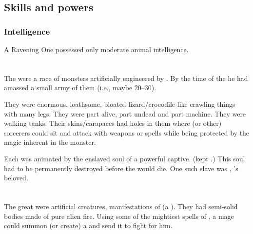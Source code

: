 \subsection{Skills and powers}





\subsubsection{Intelligence}
A Ravening One possessed only moderate animal intelligence. 















\section{\Reptilecolossus}
\index{\reptilecolossus}
The \reptilecolossi were a race of monsters artificially engineered by \Secherdamon. 
By the time of the \thirdbanewar he had amassed a small army of them (i.e., maybe 20--30). 

They were enormous, loathsome, bloated lizard/crocodile-like crawling things with many legs. 
They were part alive, part undead and part machine. 
They were walking tanks.
Their skins/carapaces had holes in them where \ophidian (or other) sorcerers could sit and attack with weapons or spells while being protected by the magic inherent in the monster. 

Each \reptilecolossus was animated by the enslaved soul of a powerful \resphan captive. 
(\Secherdamon kept .) 
This soul had to be permanently destroyed before the \reptilecolossus would die. 
One such slave was , \Sithiyacaan's beloved.















\section{\FireSalamander}
The great \firesalamanders were artificial creatures, manifestations of  (a \xs). 
They had semi-solid bodies made of pure alien fire.
Using some of the mightiest spells of , a mage could summon (or create) a \firesalamander and send it to fight for him. 

